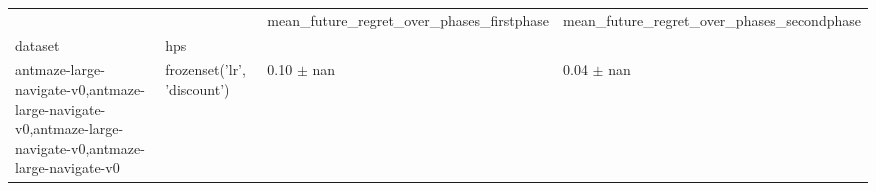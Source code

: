 \begin{tabular}{llll}
\toprule
 &  & mean_future_regret_over_phases_firstphase & mean_future_regret_over_phases_secondphase \\
dataset & hps &  &  \\
\midrule
antmaze-large-navigate-v0,antmaze-large-navigate-v0,antmaze-large-navigate-v0,antmaze-large-navigate-v0 & frozenset({'lr', 'discount'}) & 0.10 $\pm$ nan & 0.04 $\pm$ nan \\
\cline{1-4}
\bottomrule
\end{tabular}
